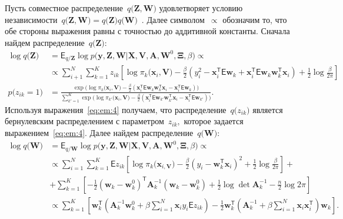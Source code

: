 Пусть совместное распределение~$q\bigr(\mathbf{Z}, \mathbf{W}\bigr)$ удовлетворяет условию независимости~$q\bigr(\mathbf{Z}, \mathbf{W}\bigr) = q\bigr(\mathbf{Z}\bigr)q\bigr(\mathbf{W}\bigr)$~\cite{bishop2006}. 
Далее символом~$\propto$ обозначим то, что обе стороны выражения равны с точностью до аддитивной константы.
Сначала найдем распределение~$q\bigr(\textbf{Z}\bigr)$:
\[
\label{eq:em:4}
\begin{aligned}
\log q\bigr(\textbf{Z}\bigr) &= \mathsf{E}_{q/\textbf{Z}} \log p\bigr(\mathbf{y}, \mathbf{Z}, \mathbf{W}|\mathbf{X}, \mathbf{V}, \textbf{A}, \textbf{W}^{0}, \bm{\Xi}, \beta\bigr)  \propto\\
&\propto \sum_{i+1}^{N}\sum_{k=1}^{K}z_{ik}\left[\log\pi_{k}\bigr(\textbf{x}_{i}, \textbf{V}\bigr) - \frac{\beta}{2}\left(y_{i}^{2} -\textbf{x}_{i}^{\mathsf{T}}\mathsf{E}\textbf{w}_{k} + \textbf{x}_{i}^{\mathsf{T}}\mathsf{E}\textbf{w}_{k}\textbf{w}_{k}^{\mathsf{T}}\textbf{x}_{i}\right) + \frac{1}{2}\log\frac{\beta}{2\pi}\right]\\
p\bigr(z_{ik} = 1\bigr) &= \frac{\exp\bigr(\log\pi_{k}\bigr(\textbf{x}_{i}, \textbf{V}\bigr) - \frac{\beta}{2}\left(\textbf{x}_{i}^{\mathsf{T}}\mathsf{E}\textbf{w}_{k}\textbf{w}_{k}^{\mathsf{T}}\textbf{x}_{i} - \textbf{x}_{i}^{\mathsf{T}}\mathsf{E}\textbf{w}_{k}\right)\bigr)}{\sum_{k'=1}^{K}\exp\bigr(\log\pi_{k'}\bigr(\textbf{x}_{i}, \textbf{V}\bigr) - \frac{\beta}{2}\left(\textbf{x}_{i}^{\mathsf{T}}\mathsf{E}\textbf{w}_{k'}\textbf{w}_{k'}^{\mathsf{T}}\textbf{x}_{i} - \textbf{x}_{i}^{\mathsf{T}}\mathsf{E}\textbf{w}_{k'}\right)\bigr)}.
\end{aligned}
\]
Используя выражения~\eqref{eq:em:4} получаем, что распределение~$q\bigr(z_{ik}\bigr)$ является бернулевским распределением с параметром~$z_{ik},$ которое задается выражением~\eqref{eq:em:4}.
Далее найдем распределение~$q\bigr(\textbf{W}\bigr)$:
\[
\label{eq:em:5}
\begin{aligned}
\log q\bigr(\textbf{W}\bigr) &= \mathsf{E}_{q/\textbf{W}}\log p\bigr(\mathbf{y}, \mathbf{Z}, \mathbf{W}|\mathbf{X}, \mathbf{V}, \textbf{A}, \textbf{W}^{0}, \bm{\Xi}, \beta\bigr) \propto\\
&\propto \sum_{i=1}^{N}\sum_{k=1}^{K}\mathsf{E}z_{ik}\left[\log\pi_{k}\bigr(\textbf{x}_{i, \textbf{V}}\bigr) - \frac{\beta}{2}\left(y_{i} - \textbf{w}_{k}^{\mathsf{T}}\textbf{x}_{i}\right)^{2} + \frac{1}{2}\log\frac{\beta}{2\pi}\right] + \\
&+ \sum_{k=1}^{K}\left[-\frac{1}{2}\left(\textbf{w}_{k} - \textbf{w}_{k}^{0}\right)^{\mathsf{T}}\textbf{A}_{k}^{-1}\left(\textbf{w}_{k} - \textbf{w}_{k}^{0}\right) + \frac{1}{2}\log\det\textbf{A}^{-1}_{k} - \frac{n}{2}\log2\pi\right] \\
&\propto \sum_{k=1}^{K}\left[\textbf{w}_{k}^{\mathsf{T}}\left(\textbf{A}_{k}^{-1}\textbf{w}_{k}^{0}+\beta\sum_{i=1}^{N}\textbf{x}_{i}y_{i}\mathsf{E}z_{ik}\right)-\frac{1}{2}\textbf{w}_{k}^{\mathsf{T}}\left(\textbf{A}_{k}^{-1}+\beta\sum_{i=1}^{N}\textbf{x}_{i}\textbf{x}_{i}^{\mathsf{T}}\right)\textbf{w}_{k}\right].
\end{aligned}
\]
